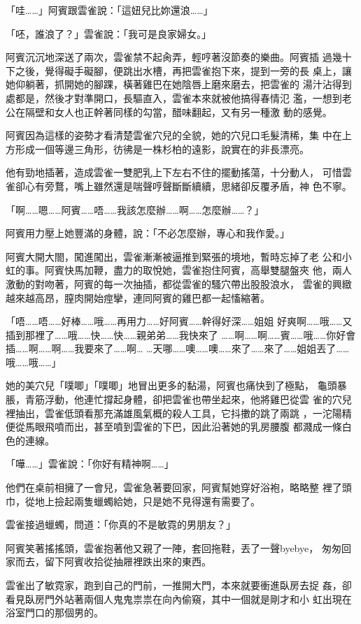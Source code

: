 「哇……」阿賓跟雲雀說：「這妞兒比妳還浪……」

「呸，誰浪了？」雲雀說：「我可是良家婦女。」

阿賓沉沉地深送了兩次，雲雀禁不起肏弄，輕哼著沒節奏的樂曲。阿賓插
過幾十下之後，覺得礙手礙腳，便跳出水槽，再把雲雀抱下來，提到一旁的長
桌上，讓她仰躺著，抓開她的腳踝，橫著雞巴在她陰唇上磨來磨去，把雲雀的
湯汁沾得到處都是，然後才對準開口，長驅直入，雲雀本來就被他搞得春情氾
濫，一想到老公在隔壁和女人也正幹著同樣的勾當，醋味翻起，又有另一種激
動的感覺。

阿賓因為這樣的姿勢才看清楚雲雀穴兒的全貌，她的穴兒口毛髮清稀，集
中在上方形成一個等邊三角形，彷彿是一株杉柏的遠影，說實在的非長漂亮。

他有勁地插著，造成雲雀一雙肥乳上下左右不住的擺動搖蕩，十分動人，
可惜雲雀卻心有旁鶩，嘴上雖然還是喘聲哼聲斷斷續續，思緒卻反覆矛盾，神
色不寧。

「啊……嗯……阿賓……唔……我該怎麼辦……啊……怎麼辦……？」

阿賓用力壓上她豐滿的身體，說：「不必怎麼辦，專心和我作愛。」

阿賓大開大閤，闖進闖出，雲雀漸漸被逼推到緊張的境地，暫時忘掉了老
公和小虹的事。阿賓快馬加鞭，盡力的取悅她，雲雀抱住阿賓，高舉雙腿盤夾
他，兩人激動的對吻著，阿賓的每一次抽插，都從雲雀的騷穴帶出股股浪水，
雲雀的興緻越來越高昂，膣肉開始痙攣，連同阿賓的雞巴都一起慉縮著。

「唔……唔……好棒……哦……再用力……好阿賓……幹得好深……姐姐
好爽啊……哦……又插到那裡了……哦……快……快……親弟弟……我快來了
……啊……啊……賓……哦……你好會插……啊……啊……我要來了……啊…
…天哪……噢……噢……來了……來了……姐姐丟了……哦……哦……」

她的美穴兒「噗唧」「噗唧」地冒出更多的黏湯，阿賓也痛快到了極點，
龜頭暴脹，青筋浮動，他連忙撐起身體，卻把雲雀也帶坐起來，他將雞巴從雲
雀的穴兒裡抽出，雲雀低頭看那充滿雄風氣概的殺人工具，它抖擻的跳了兩跳
，一沱陽精便從馬眼飛噴而出，甚至噴到雲雀的下巴，因此沿著她的乳房腰腹
都濺成一條白色的連線。

「嘩……」雲雀說：「你好有精神啊……」

他們在桌前相擁了一會兒，雲雀急著要回家，阿賓幫她穿好浴袍，略略整
裡了頭巾，從地上撿起兩隻蠟蠋給她，只是她不見得還有需要了。

雲雀接過蠟蠋，問道：「你真的不是敏霓的男朋友？」

阿賓笑著搖搖頭，雲雀抱著他又親了一陣，套回拖鞋，丟了一聲byebye，
匆匆回家而去，留下阿賓收拾從抽屜裡跌出來的東西。

雲雀出了敏霓家，跑到自己的門前，一推開大門，本來就要衝進臥房去捉
姦，卻看見臥房門外站著兩個人鬼鬼祟祟在向內偷窺，其中一個就是剛才和小
虹出現在浴室門口的那個男的。

